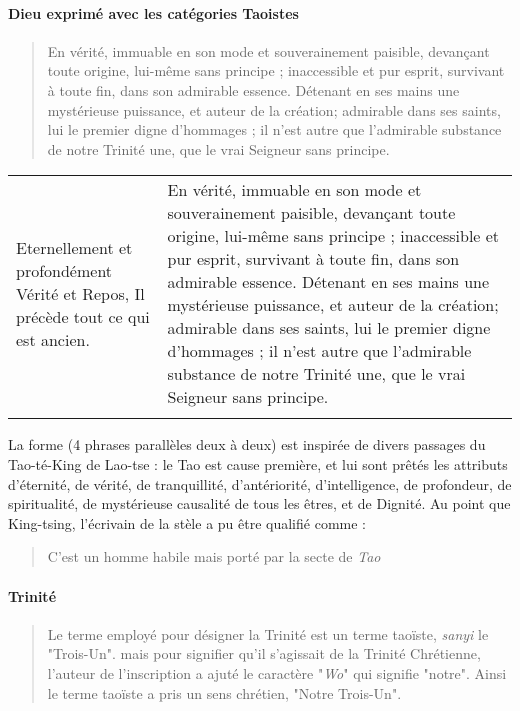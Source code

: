 \paragraph{Dieu exprimé avec les catégories Taoistes} 
\begin{quote}
    En vérité, immuable en son mode et souverainement paisible,
devançant toute origine,
lui-même sans principe ; inaccessible et
pur esprit, survivant à toute fin, dans son
admirable essence. Détenant en ses mains
une mystérieuse puissance, et auteur de la
création; admirable dans ses saints, lui le
premier digne d'hommages ; il n'est autre
que l'admirable substance de notre Trinité
une, que le vrai Seigneur sans principe.

\end{quote} 

\begin{table}[h!]
\begin{tabular}{p{5cm}p{5cm}}
Eternellement et profondément Vérité et Repos, Il précède tout ce qui est ancien. & En vérité, immuable en son mode et souverainement paisible,  devançant toute origine, lui-même sans principe ; inaccessible et  pur esprit, survivant à toute fin, dans son  admirable essence. Détenant en ses mains  une mystérieuse puissance, et auteur de la création; admirable dans ses saints, lui le  premier digne d'hommages ; il n'est autre  que l'admirable substance de notre Trinité  une, que le vrai Seigneur sans principe.  \\
                                                  &               \\
\end{tabular}
\end{table}
La forme (4 phrases parallèles deux à deux) est inspirée de divers passages du Tao-té-King de Lao-tse : le Tao est cause première,  et lui sont prêtés les attributs d'éternité, de vérité, de tranquillité, d'antériorité, d'intelligence, de profondeur, de spiritualité, de mystérieuse causalité de tous les êtres, et de Dignité. 
Au point que King-tsing, l'écrivain de la stèle a pu être qualifié comme :
\begin{quote}
    C'est un homme habile mais porté par la secte de \textit{Tao} 
\end{quote}

\paragraph{Trinité}
\begin{quote} Le terme employé pour désigner la Trinité est un terme taoïste, \emph{sanyi} le "Trois-Un". mais pour signifier qu'il s'agissait de la Trinité Chrétienne, l'auteur de l'inscription a ajuté le caractère "\emph{Wo}" qui signifie "notre". Ainsi le terme taoïste a pris un sens chrétien, "Notre Trois-Un".
    \cite[p.43]{Raguin:JesusMessieXian}
\end{quote}

